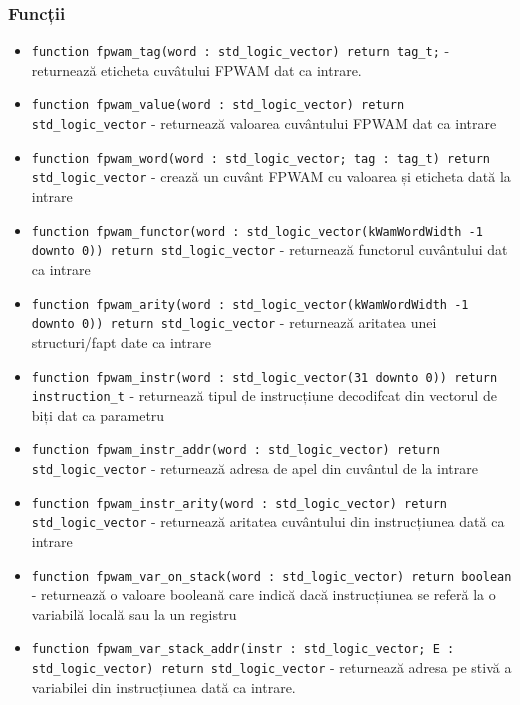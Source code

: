 \documentclass[12pt,a4paper,twoside]{report}
\begin{document}
\subsubsection{Funcții}
\begin{itemize}
  \item \texttt{function fpwam\_tag(word : std\_logic\_vector) return tag\_t;} - returnează eticheta cuvâtului FPWAM dat ca intrare.
  \item \texttt{function fpwam\_value(word : std\_logic\_vector) return std\_logic\_vector} - returnează valoarea cuvântului FPWAM dat ca intrare
  \item \texttt{function fpwam\_word(word : std\_logic\_vector; tag : tag\_t) return std\_logic\_vector} - crează un cuvânt FPWAM cu valoarea și eticheta dată la intrare
  \item \texttt{function fpwam\_functor(word : std\_logic\_vector(kWamWordWidth -1 downto 0)) return std\_logic\_vector} - returnează functorul cuvântului dat ca intrare
  \item \texttt{function fpwam\_arity(word : std\_logic\_vector(kWamWordWidth -1 downto 0)) return std\_logic\_vector} - returnează aritatea unei structuri/fapt date ca intrare
  \item \texttt{function fpwam\_instr(word : std\_logic\_vector(31 downto 0)) return instruction\_t} - returnează tipul de instrucțiune decodifcat din vectorul de biți dat ca parametru
  \item \texttt{function fpwam\_instr\_addr(word : std\_logic\_vector) return std\_logic\_vector} - returnează adresa de apel din cuvântul de la intrare
  \item \texttt{function fpwam\_instr\_arity(word : std\_logic\_vector) return std\_logic\_vector} - returnează aritatea cuvântului din instrucțiunea dată ca intrare
  \item \texttt{function fpwam\_var\_on\_stack(word : std\_logic\_vector) return boolean} - returnează o valoare booleană care indică dacă instrucțiunea se referă la o variabilă locală sau la un registru
  \item \texttt{function fpwam\_var\_stack\_addr(instr : std\_logic\_vector; E : std\_logic\_vector) return std\_logic\_vector} - returnează adresa pe stivă a variabilei din instrucțiunea dată ca intrare.
\end{itemize}
\end{document}
